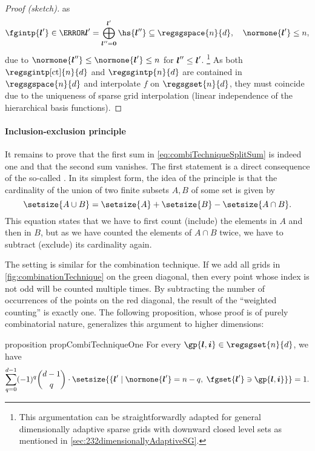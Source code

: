 \begin{proof}[Proof (sketch)]
  as
  \begin{equation}
    \fgintp{\*l'} \in
    \ns{\*l'}
    = \bigoplus_{\*l''=\*0}^{\*l'} \hs{\*l''}
    \subset \regsgspace{n}{d},\quad
    \normone{\*l'} \le n,
  \end{equation}
  due to $\normone{\*l''} \le \normone{\*l'} \le n$
  for ${\boldsymbol{l}}'' \le {\boldsymbol{l}}'$.%
  \footnote{%
    This argumentation can be straightforwardly adapted
    for general dimensionally adaptive sparse grids
    with downward closed level sets as mentioned in
    \cref{sec:232dimensionallyAdaptiveSG}.%
  }
  As both $\regsgintp[\ct]{n}{d}$ and $\regsgintp{n}{d}$
  are contained in $\regsgspace{n}{d}$ and
  interpolate $f$ on $\regsgset{n}{d}$, they must coincide
  due to the uniqueness of sparse grid interpolation
  (linear independence of the hierarchical basis functions).
\end{proof}

\paragraph{Inclusion-exclusion principle}

It remains to prove that the first sum in \eqref{eq:combiTechniqueSplitSum}
is indeed one and that the second sum vanishes.
The first statement is a direct consequence of the so-called
.
In its simplest form, the idea of the principle is that the cardinality
of the union of two finite subsets $A, B$ of some set is given by
\begin{equation}
  \setsize{A \cup B}
  = \setsize{A} + \setsize{B} - \setsize{A \cap B}.
\end{equation}
This equation states that we have to first count (include)
the elements in $A$ and then in $B$,
but as we have counted the elements of $A \cap B$ twice,
we have to subtract (exclude) its cardinality again.

The setting is similar for the combination technique.
If we add all grids in \cref{fig:combinationTechnique}
on the green diagonal, then every point whose index is not odd
will be counted multiple times.
By subtracting the number of occurrences of the points on the
red diagonal,
the result of the ``weighted counting'' is exactly one.
The following proposition, whose proof is of purely combinatorial nature,
generalizes this argument to higher dimensions:

\begin{restatable}{%
  proposition%
}{%
  propCombiTechniqueOne%
}
  \label{prop:combiTechniqueOne}
  For every $\gp{\*l,\*i} \in \regsgset{n}{d}$, we have
  \begin{equation}
    \label{eq:combiTechniqueOne}
    \sum_{q=0}^{d-1} (-1)^q \binom{d-1}{q} \cdot
    \setsize{
      \{\*l' \mid \normone{\*l'} = n - q,\; \fgset{\*l'} \ni \gp{\*l,\*i}\}
    }
    = 1.
  \end{equation}
\end{restatable}

